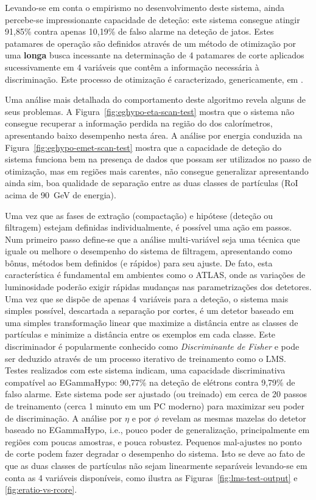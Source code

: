 Levando-se em conta o empirismo no desenvolvimento deste sistema, ainda
percebe-se impressionante capacidade de deteção: este sistema consegue atingir
91,85\% contra apenas 10,19\% de falso alarme na deteção de jatos. Estes
patamares de operação são definidos através de um método de otimização por uma
\textbf{longa} busca incessante na determinação de 4 patamares de corte
aplicados sucessivamente em 4 variáveis que contêm a informação necessária à
discriminação. Este processo de otimização é caracterizado, genericamente, em
\cite{daqnote00-02}.

Uma análise mais detalhada do comportamento deste algoritmo revela alguns de
seus problemas. A Figura~\ref{fig:eghypo-eta-scan-test} mostra que o sistema
não consegue recuperar a informação perdida na região do  dos
calorímetros, apresentando baixo desempenho nesta área. A análise por energia
conduzida na Figura~\ref{fig:eghypo-emet-scan-test} mostra que a capacidade de
deteção do sistema funciona bem na presença de dados que possam ser utilizados
no passo de otimização, mas em regiões mais carentes, não consegue generalizar
apresentando ainda sim, boa qualidade de separação entre as duas classes de
partículas (RoI acima de 90~GeV de energia).

Uma vez que as fases de extração (compactação) e hipótese (deteção ou
filtragem) estejam definidas individualmente, é possível uma ação em
passos. Num primeiro passo define-se que a análise multi-variável seja uma
técnica que iguale ou melhore o desempenho do sistema de filtragem,
apresentando como bônus, métodos bem definidos (e rápidos) para seu ajuste. De
fato, esta característica é fundamental em ambientes como o ATLAS, onde as
variações de luminosidade poderão exigir rápidas mudanças nas parametrizações
dos detetores. Uma vez que se dispõe de apenas 4 variáveis para a deteção, o
sistema mais simples possível, descartada a separação por cortes, é um detetor
baseado em uma simples transformação linear que maximize a distância entre as
classes de partículas e minimize a distância entre os exemplos em cada
classe. Este discriminador é popularmente conhecido como \textit{Discriminante
de Fisher} \cite{fisher} e pode ser deduzido através de um processo iterativo
de treinamento como o LMS. Testes realizados com este sistema indicam, uma
capacidade discriminativa compatível ao EGammaHypo: 90,77\% na deteção de
elétrons contra 9,79\% de falso alarme. Este sistema pode ser ajustado (ou
treinado) em cerca de 20 passos de treinamento (cerca 1 minuto em um PC
moderno) para maximizar seu poder de discriminação. A análise por $\eta$ e por
$\phi$ revelam as mesmas mazelas do detetor baseado no EGammaHypo, i.e., pouco
poder de generalização, principalmente em regiões com poucas amostras, e pouca
robustez. Pequenos mal-ajustes no ponto de corte podem fazer degradar o
desempenho do sistema. Isto se deve ao fato de que as duas classes de
partículas não sejam linearmente separáveis levando-se em conta as 4 variáveis
disponíveis, como ilustra as Figuras~\ref{fig:lms-test-output} e
\ref{fig:eratio-vs-rcore}.

